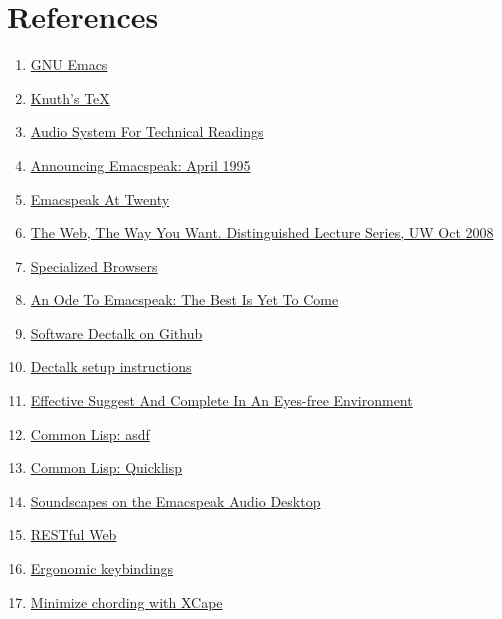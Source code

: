 \documentclass[11pt]{article}
\begin{document}
\section{References}
\label{sec:org93a590b}
\begin{enumerate}
\item \href{https://www.gnu.org/s/emacs/}{GNU Emacs}
\item \href{https://en.wikipedia.org/wiki/TeX}{Knuth's \TeX{}}
\item \href{https://emacspeak.blogspot.com/2022/12/aster-spoken-math-on-emacspeak-audio\_21.html}{Audio System For Technical Readings}
\item \href{https://tvraman.github.io/emacspeak//web/releases/release-3.0.html}{Announcing Emacspeak: April 1995}
\item \href{https://emacspeak.sourceforge.net/turning-twenty.html}{Emacspeak At Twenty}
\item \href{http://www.cs.washington.edu/htbin-post/mvis/mvis?ID=636}{The Web, The Way You Want.  Distinguished Lecture Series, UW Oct 2008}
\item \href{https://emacspeak.sourceforge.net/raman/publications/specialized-browsers/}{Specialized Browsers}
\item \href{https://tvraman.github.io/emacspeak/web/01-gemini.ogg}{An Ode To Emacspeak: The Best Is Yet To Come}
\item \href{https://github.com/dectalk/dectalk.git}{Software Dectalk on Github}
\item \href{https://raw.githubusercontent.com/tvraman/emacspeak/master/servers/software-dtk/Readme.org}{Dectalk  setup instructions}
\item \href{https://emacspeak.blogspot.com/2018/06/effective-suggest-and-complete-in-eyes.html}{Effective Suggest And Complete In An Eyes-free Environment}
\item \href{https://asdf.common-lisp.dev/asdf.html}{Common Lisp: asdf}
\item \href{https://www.quicklisp.org/}{Common Lisp: Quicklisp}
\item \href{https://emacspeak.blogspot.com/2015/12/soundscapes-on-emacspeak-audio-desktop.html}{Soundscapes on the Emacspeak Audio Desktop}
\item \href{https://en.wikipedia.org/wiki/REST}{RESTful Web}
\item \href{https://emacspeak.blogspot.com/2023/09/emacs-ergonomics-dont-punish-your.html}{Ergonomic keybindings}
\item \href{https://github.com/alols/xcape}{Minimize chording with XCape}

\end{enumerate}
\end{document}
